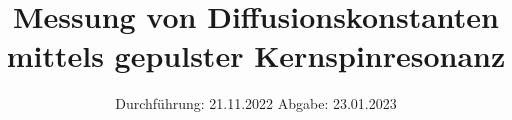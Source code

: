 

\subject{Versuch Nr.V49}
\title{Messung von Diffusionskonstanten mittels
gepulster Kernspinresonanz}
\date{%
  Durchführung: 21.11.2022
  \hspace{3em}
  Abgabe: 23.01.2023
}



\maketitle
\thispagestyle{empty}
\tableofcontents
\newpage 








\nocite{*}

\printbibliography{}


